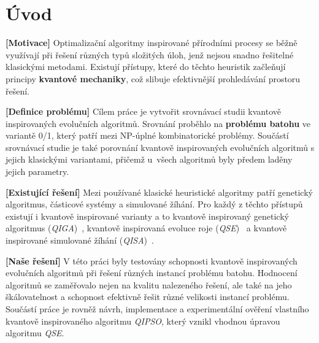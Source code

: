 \documentclass[czech]{ExcelAtFIT} %
\affiliation{*%
  \href{mailto:xbartu11@stud.fit.vutbr.cz}{xbartu11@stud.fit.vutbr.cz},
  \textit{Faculty of Information Technology, Brno University of Technology}}
\begin{document}
\startdocument


\section{Úvod}
\label{sec:Introduction}

\textbf{[Motivace]}
Optimalizační algoritmy inspirované přírodními procesy se běžně využívají při řešení různých typů složitých úloh, jenž nejsou snadno řešitelné klasickými metodami. 
Existují přístupy, které do těchto heuristik začleňují principy \textbf{kvantové mechaniky}, což slibuje efektivnější prohledávání prostoru řešení.

\textbf{[Definice problému]}
Cílem práce je vytvořit srovnávací studii kvantově inspirovaných evolučních algoritmů. 
Srovnání proběhlo na \textbf{problému batohu} ve variantě 0/1, který patří mezi NP-úplné kombinatorické problémy. 
Součástí srovnávací studie je také porovnání kvantově inspirovaných evolučních algoritmů s jejich klasickými variantami, přičemž u~všech algoritmů byly předem laděny jejich parametry. 

\textbf{[Existující řešení]}
Mezi používané klasické heuristické algoritmy patří genetický algoritmus, částicové systémy a simulované žíhání. 
Pro každý z těchto přístupů existují i kvantově inspirované varianty a to kvantově inspirovaný genetický algoritmus (\emph{QIGA})~\cite{qiga}, kvantově inspirovaná evoluce roje (\emph{QSE})~\cite{qse} a kvantově inspirované simulované žíhání (\emph{QISA})~\cite{qisa}.

\textbf{[Naše řešení]}
V této práci byly testovány schopnosti kvantově inspirovaných evolučních algoritmů při řešení různých instancí problému batohu. 
Hodnocení algoritmů se zaměřovalo nejen na kvalitu nalezeného řešení, ale také na jeho škálovatelnost a schopnost efektivně řešit různé velikosti instancí problému. 
Součástí práce je rovněž návrh, implementace a experimentální ověření vlastního kvantově inspirovaného algoritmu \emph{QIPSO}, který vznikl vhodnou úpravou algoritmu \emph{QSE}.

\end{document}
